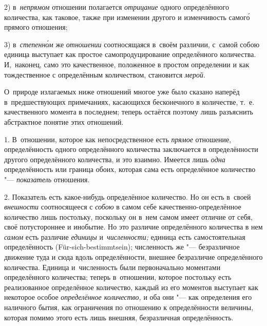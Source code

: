 2) в~{\em непрямом} отношении полагается {\em отрицание} одного определённого
количества, как таковое, также при изменении другого и изменчивость самог\'{о}
прямого отношения;

3) в~{\em степенн\'{о}м} же {\em отношении} соотносящаяся в~своём различии,
с~самой собою единица выступает как простое самопродуцирование определённого
количества. И,~наконец, само это качественное, положенное в простом определении
и как тождественное с определённым количеством, становится {\em мерой}.

О~природе излагаемых ниже отношений многое уже было сказано наперёд
в~предшествующих примечаниях, касающихся бесконечного в количестве, т.~е.
качественного момента в последнем; теперь остаётся поэтому лишь разъяснить
абстрактное понятие этих отношений.


1. В~отношении, которое как непосредственное есть {\em прямое} отношение,
определённость одного определённого количества заключается в определённости
другого определённого количества, и это взаимно. Имеется лишь {\em одна}
определённость или граница обоих, которая сама есть определённое количество
"--- {\em показатель} отношения.

2. Показатель есть какое-нибудь определённое количество. Но он есть в~своей
{\em внешности} соотносящееся с {\em собою} в самом себе
качественно-определённое количество лишь постольку, поскольку он в~нем самом
имеет отличие от себя, своё потустороннее и инобытие. Но это различие
определённого количества в нем {\em самом} есть различие {\em единицы}
и~{\em численности;} единица есть самостоятельная определённость
(Für-sich-bestimmt\-sein); численность же "--- безразличное движение туда и
сюда вдоль определённости, внешнее безразличие определённого количества.
Единица и~численность были первоначально моментами определённого количества;
теперь в~отношении, которое постольку есть реализованное определённое
количество, каждый из его моментов выступает как некоторое особое
{\em определённое количество,} и оба они "--- как определения его наличного
бытия, как ограничения по отношению к определённости величины, которая помимо
этого есть лишь внешняя, безразличная определённость.

